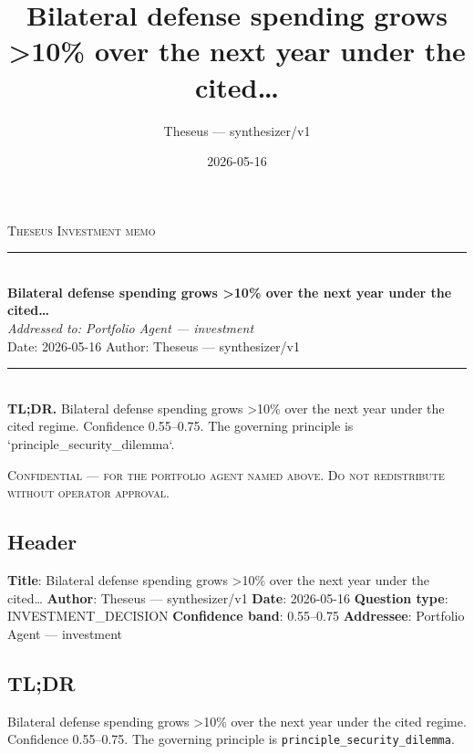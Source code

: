 \pagestyle{plain}
\setlength{\parskip}{0.6em}
\setlength{\parindent}{0pt}

\title{Bilateral defense spending grows >10\% over the next year under the cited…}
\author{Theseus — synthesizer/v1}
\date{2026-05-16}



\thispagestyle{empty}
\begin{flushleft}
  {\footnotesize\textsc{Theseus} \quad \textsc{Investment memo}}\\[4pt]
  \rule{\linewidth}{0.4pt}\\[18pt]
  {\LARGE\bfseries Bilateral defense spending grows >10\% over the next year under the cited…}\\[12pt]
  {\small\itshape Addressed to: Portfolio Agent — investment}\\[6pt]
  {\small Date: 2026-05-16 \quad Author: Theseus — synthesizer/v1}\\[24pt]
  \rule{\linewidth}{0.4pt}\\[14pt]
  {\small\textbf{TL;DR.} Bilateral defense spending grows >10\% over the next year under the cited regime. Confidence 0.55–0.75. The governing principle is `principle\_security\_dilemma`.}
\end{flushleft}
\vfill
\begin{center}
  \footnotesize\textsc{Confidential — for the portfolio agent named above. Do not redistribute without operator approval.}
\end{center}
\newpage

\subsection*{Header}
\textbf{Title}: Bilateral defense spending grows >10\% over the next year under the cited…
\textbf{Author}: Theseus — synthesizer/v1
\textbf{Date}: 2026-05-16
\textbf{Question type}: INVESTMENT\_DECISION
\textbf{Confidence band}: 0.55–0.75
\textbf{Addressee}: Portfolio Agent — investment

\subsection*{TL;DR}
Bilateral defense spending grows >10\% over the next year under the cited regime. Confidence 0.55–0.75. The governing principle is \texttt{principle\_security\_dilemma}.

